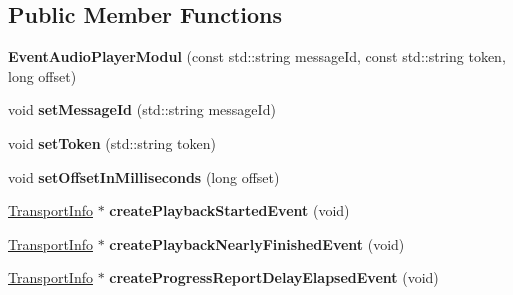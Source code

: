 \subsection*{Public Member Functions}
\begin{DoxyCompactItemize}
\item 
\mbox{\label{classAlexaEvent_1_1EventAudioPlayerModul_a5ec831426b553c635b3f268637cb4a9b}} 
{\bfseries Event\+Audio\+Player\+Modul} (const std\+::string message\+Id, const std\+::string token, long offset)
\item 
\mbox{\label{classAlexaEvent_1_1EventAudioPlayerModul_ae3f75eff34187dcb5c7956b22d544c2d}} 
void {\bfseries set\+Message\+Id} (std\+::string message\+Id)
\item 
\mbox{\label{classAlexaEvent_1_1EventAudioPlayerModul_a53d63dbe921a379c5c96ed3043bc90cb}} 
void {\bfseries set\+Token} (std\+::string token)
\item 
\mbox{\label{classAlexaEvent_1_1EventAudioPlayerModul_acd9880ef19d77f4ea204fba2020d3fbe}} 
void {\bfseries set\+Offset\+In\+Milliseconds} (long offset)
\item 
\mbox{\label{classAlexaEvent_1_1EventAudioPlayerModul_ad55f28691f0baf878245bada4d0b79d8}} 
\hyperlink{classAlexaEvent_1_1TransportInfo}{Transport\+Info} $\ast$ {\bfseries create\+Playback\+Started\+Event} (void)
\item 
\mbox{\label{classAlexaEvent_1_1EventAudioPlayerModul_af280ed131eb18f3377e018a0de6d780e}} 
\hyperlink{classAlexaEvent_1_1TransportInfo}{Transport\+Info} $\ast$ {\bfseries create\+Playback\+Nearly\+Finished\+Event} (void)
\item 
\mbox{\label{classAlexaEvent_1_1EventAudioPlayerModul_ab6bccf80ceed93d7d3233d1a6cb474db}} 
\hyperlink{classAlexaEvent_1_1TransportInfo}{Transport\+Info} $\ast$ {\bfseries create\+Progress\+Report\+Delay\+Elapsed\+Event} (void)
\item 
\mbox{\label{classAlexaEvent_1_1EventAudioPlayerModul_abbc64c37aaf67976913108c38bea953e}} 

\end{DoxyCompactItemize}
